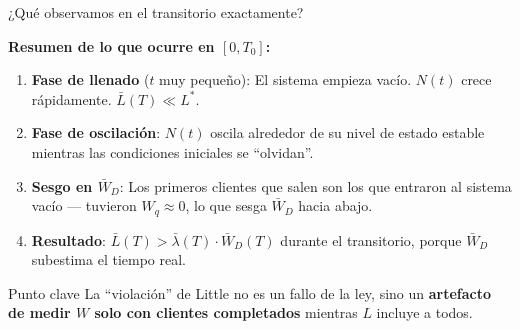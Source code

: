 \documentclass[aspectratio=1610, 9pt]{beamer}
\begin{document}
\begin{frame}{¿Qué observamos en el transitorio exactamente?}

\textbf{Resumen de lo que ocurre en $[0, T_0]$:}

\vspace{0.3cm}
\begin{enumerate}
    \item \textbf{Fase de llenado} ($t$ muy pequeño): El sistema empieza vacío. $N(t)$ crece rápidamente. $\bar{L}(T) \ll L^*$.
    
    \vspace{0.2cm}
    \item \textbf{Fase de oscilación}: $N(t)$ oscila alrededor de su nivel de estado estable mientras las condiciones iniciales se ``olvidan''.
    
    \vspace{0.2cm}
    \item \textbf{Sesgo en $\bar{W}_D$}: Los primeros clientes que salen son los que entraron al sistema vacío --- tuvieron $W_q \approx 0$, lo que sesga $\bar{W}_D$ hacia abajo.
    
    \vspace{0.2cm}
    \item \textbf{Resultado}: $\bar{L}(T) > \bar{\lambda}(T) \cdot \bar{W}_D(T)$ durante el transitorio, porque $\bar{W}_D$ subestima el tiempo real.
\end{enumerate}

\vspace{0.3cm}
\begin{alertblock}{Punto clave}
La ``violación'' de Little no es un fallo de la ley, sino un \textbf{artefacto de medir $W$ solo con clientes completados} mientras $L$ incluye a todos.
\end{alertblock}
\end{frame}
\end{document}
